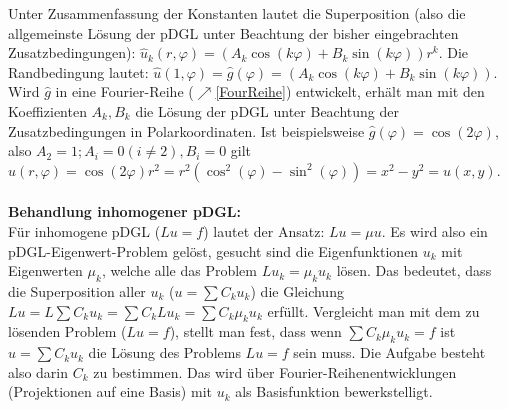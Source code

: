 {    	Unter Zusammenfassung der Konstanten lautet die Superposition (also die allgemeinste Lösung der pDGL unter Beachtung der bisher eingebrachten Zusatzbedingungen): $\hat{u}_k(r,\varphi)=\left(A_k\cos(k\varphi)+B_k\sin(k\varphi)\right)r^k$. Die Randbedingung lautet: $\hat{u}(1,\varphi)=\hat{g}(\varphi)=\left(A_k\cos(k\varphi)+B_k\sin(k\varphi)\right)$. Wird $\hat{g}$ in eine Fourier-Reihe ($\nearrow$\ref{FourReihe}) entwickelt, erhält man mit den Koeffizienten $A_k,B_k$ die Lösung der pDGL unter Beachtung der Zusatzbedingungen in Polarkoordinaten. Ist beispielsweise $\hat{g}(\varphi)=\cos (2\varphi)$, also $A_2=1;A_i=0 (i\neq 2),B_i=0$ gilt $\hat{u}(r,\varphi)=\cos(2\varphi)r^2=r^2\left(\cos^2(\varphi)-\sin^2(\varphi)\right)=x^2-y^2=u(x,y)$.}\\\\
    	\textbf{Behandlung inhomogener pDGL:}\\
    	Für inhomogene pDGL ($Lu=f$) lautet der Ansatz: $Lu=\mu u$. Es wird also ein pDGL-Eigenwert-Problem gelöst, gesucht sind die Eigenfunktionen $u_k$ mit Eigenwerten $\mu_k$, welche alle das Problem $Lu_k=\mu_k u_k$ lösen. Das bedeutet, dass die Superposition aller $u_k$ ($u=\sum C_k u_k$) die Gleichung $Lu=L\sum C_k u_k =  \sum C_k Lu_k=\sum C_k \mu_k u_k$ erfüllt. Vergleicht man mit dem zu lösenden Problem ($Lu=f$), stellt man fest, dass wenn  $\sum C_k \mu_k u_k=f$ ist $u=\sum C_k u_k$ die Lösung des Problems $Lu=f$ sein muss. Die Aufgabe besteht also darin $C_k$ zu bestimmen. Das wird über Fourier-Reihenentwicklungen (Projektionen auf eine Basis) mit $u_k$ als Basisfunktion bewerkstelligt.\\
